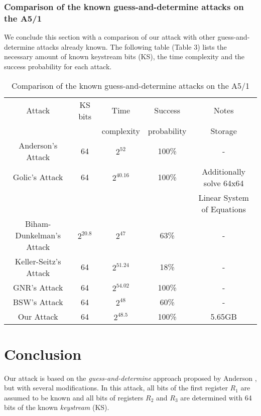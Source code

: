 \documentclass{llncs}
\begin{document}
\subsubsection{Comparison of the known guess-and-determine attacks on the A5/1}
We conclude this section with a comparison of our attack with other guess-and-determine attacks already known. The following table (Table 3) lists the necessary amount of known keystream bits (KS), the time complexity and the success probability for each attack.
\begin{table}[!htb]
\caption{Comparison of the known guess-and-determine attacks on the A5/1} \centering      \begin{tabular}{|c|c| c| c| c|}  \hline                        Attack & KS bits & Time  & Success & Notes \\&             &complexity &probability & Storage\\[0.5ex]
\hline                 Anderson's Attack\cite{[And]} & 64 & $2^{52}$ & 100\% & - \\   Golic's Attack\cite{[Golic]} & 64 & $2^{40.16}$ & 100\% & Additionally solve 64x64 \\ 
 & & & & Linear System of Equations\\
Biham-Dunkelman's Attack\cite{[BD]}& $2^{20.8}$ & $2^{47}$ & 63\% & -  \\ 
Keller-Seitz's Attack\cite{[KS01]} & 64 & $2^{51.24}$ & 18\% & -\\ 
GNR's Attack\cite{[Rupp]} & 64 & $2^{54.02}$ & 100\% & -\\
BSW's Attack\cite{[Bir]} & 64 & $2^{48} $ & 60\% & - \\
Our Attack & 64 & $2^{48.5}$ & 100\% & 5.65GB \\ [1ex]       \hline     \end{tabular} 
\label{table}  \end{table}
\section{Conclusion}
Our attack is based on the \emph{guess-and-determine} approach proposed by Anderson \cite{[And]}, but with several modifications. In this attack, all bits of the first register $R_{1}$ are assumed to be known and all bits of registers $R_{2}$ and $R_{3}$ are determined with 64 bits of the known \emph{keystream} (KS).
\end{document}
